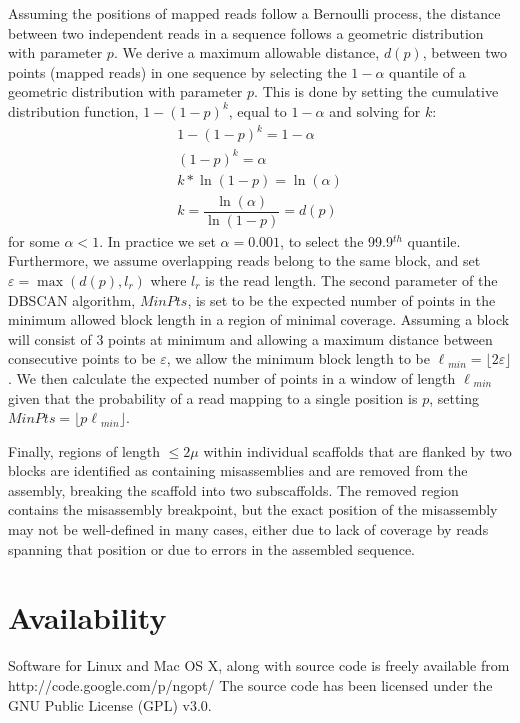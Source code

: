 \documentclass[10pt]{article}
\begin{document}
Assuming the positions of mapped reads  
follow a Bernoulli process, the distance between two independent reads in a sequence follows a geometric distribution with parameter $p$.
We derive a maximum allowable distance, $d(p)$, between two points (mapped reads) in one sequence by selecting the
$1-\alpha$ quantile of a geometric distribution with parameter $p$. This is done by setting the cumulative distribution function, $1 - (1-p)^k$, equal to $1-\alpha$ and solving for $k$:
\begin{eqnarray}
	1 - (1-p)^{k} = 1-\alpha \nonumber \\
	(1-p)^{k} = \alpha  \nonumber \\ 
	k*\ln(1-p) = \ln(\alpha)  \nonumber \\
	k = \dfrac{\ln(\alpha)}{\ln(1-p)} = d(p)
\end{eqnarray} 
for some $\alpha < 1$. In practice we set $\alpha = 0.001$, to select the 99.9$^{th}$ quantile. Furthermore, we assume overlapping reads belong to
the same block, and set $\varepsilon = \max(d(p),l_r)$ where $l_r$ is the read length.
The second parameter of the DBSCAN algorithm, $MinPts$, is set to be the expected number of points in the minimum allowed block length in a region
of minimal coverage. Assuming a block will consist of
3 points at minimum and allowing a maximum distance between consecutive points to be $\varepsilon$, we allow the minimum block length to be 
$\ell{_{min}} = \lfloor2\varepsilon\rfloor$. We then calculate the expected number of points in a window of length $\ell{_{min}}$ given that the probability of
a read mapping to a single position is $p$, setting $MinPts = \lfloor{p\ell{_{min}}}\rfloor$. 

Finally, regions of length $\le 2\mu$ within individual scaffolds that are flanked by two blocks are identified as containing
misassemblies and are removed from the assembly, breaking the scaffold into two subscaffolds. The removed region contains the 
misassembly breakpoint, but the exact position of the misassembly may not be well-defined in many cases, either due to lack of
coverage by reads spanning that position or due to errors in the assembled sequence.

\section*{Availability}
Software for Linux and Mac OS X, along with source code is freely available from http://code.google.com/p/ngopt/
The source code has been licensed under the GNU Public License (GPL) v3.0.
\end{document}
